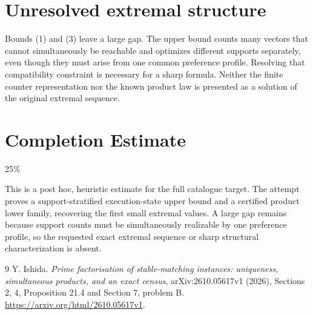\documentclass[11pt]{article}
\theoremstyle{definition}
\begin{document}
\section*{Unresolved extremal structure}
Bounds (1) and (3) leave a large gap. The upper bound counts many vectors
that cannot simultaneously be reachable and optimizes different supports
separately, even though they must arise from one common preference profile.
Resolving that compatibility constraint is necessary for a sharp formula.
Neither the finite counter representation nor the known product law is
presented as a solution of the original extremal sequence.

\section{Completion Estimate}
25\%

This is a post hoc, heuristic estimate for the full catalogue target.
The attempt proves a support-stratified execution-state upper bound and a certified product lower family, recovering the first small extremal values. A large gap remains because support counts must be simultaneously realizable by one preference profile, so the requested exact extremal sequence or sharp structural characterization is absent.

\begin{thebibliography}{9}
 Y. Ishida.
\emph{Prime factorisation of stable-matching instances: uniqueness,
simultaneous products, and an exact census}, arXiv:2610.05617v1 (2026),
Sections 2, 4, Proposition 21.4 and Section 7, problem B.
\url{https://arxiv.org/html/2610.05617v1}.
\end{thebibliography}
\end{document}
